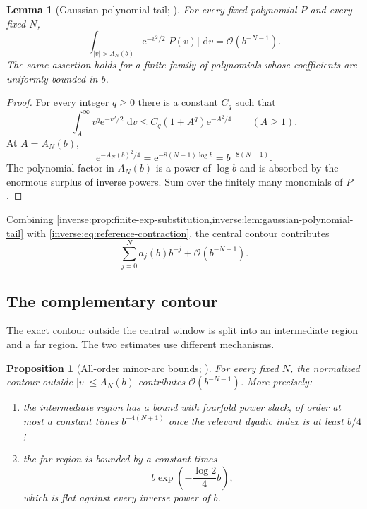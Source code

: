 \documentclass[11pt,oneside]{article}
\newtheorem{proposition}[theorem]{Proposition}
\newtheorem{lemma}[theorem]{Lemma}
\theoremstyle{definition}
\theoremstyle{remark}
\newcommand{\e}{\mathrm e}
\newcommand{\dd}{\,\mathrm d}
\newcommand{\bigO}{\mathcal O}
\begin{document}
\begin{lemma}[Gaussian polynomial tail; \Formalized]
\label{inverse:lem:gaussian-polynomial-tail}
For every fixed polynomial $P$ and every fixed $N$,
\[
 \int_{|v|>A_N(b)}\e^{-v^2/2}|P(v)|\,\dd v
 =\bigO(b^{-N-1}).
\]
The same assertion holds for a finite family of polynomials whose
coefficients are uniformly bounded in $b$.
\end{lemma}

\begin{proof}
For every integer $q\geq0$ there is a constant $C_q$ such that
\[
 \int_A^\infty v^q\e^{-v^2/2}\,\dd v
 \leq C_q(1+A^q)\e^{-A^2/4}
 \qquad(A\geq1).
\]
At $A=A_N(b)$,
\[
 \e^{-A_N(b)^2/4}
 =\e^{-8(N+1)\log b}
 =b^{-8(N+1)}.
\]
The polynomial factor in $A_N(b)$ is a power of $\log b$ and is absorbed
by the enormous surplus of inverse powers.  Sum over the finitely many
monomials of $P$.
\end{proof}

Combining \cref{inverse:prop:finite-exp-substitution,inverse:lem:gaussian-polynomial-tail}
with \eqref{inverse:eq:reference-contraction}, the central contour contributes
\begin{equation}
 \sum_{j=0}^{N}a_j(b)b^{-j}+\bigO(b^{-N-1}).
 \label{inverse:eq:central-mass-expansion}
\end{equation}

\subsection{The complementary contour}

The exact contour outside the central window is split into an intermediate
region and a far region.  The two estimates use different mechanisms.

\begin{proposition}[All-order minor-arc bounds; \Formalized]
\label{inverse:prop:minor-arcs}
For every fixed $N$, the normalized contour outside
$|v|\leq A_N(b)$ contributes $\bigO(b^{-N-1})$.
More precisely:
\begin{enumerate}
\item the intermediate region has a bound with fourfold power slack,
of order at most a constant times $b^{-4(N+1)}$ once the relevant
dyadic index is at least $b/4$;
\item the far region is bounded by a constant times
\[
 b\exp\!\left(-\frac{\log2}{4}b\right),
\]
which is flat against every inverse power of $b$.
\end{enumerate}
\end{proposition}
\end{document}
